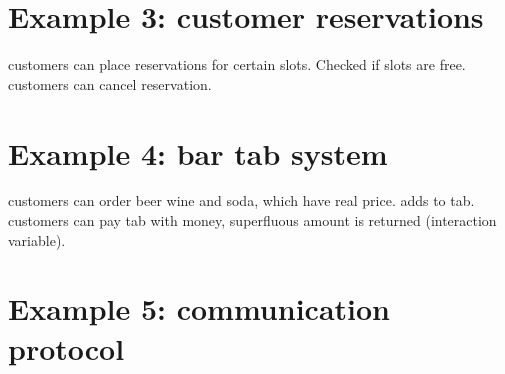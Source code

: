 \section{Example 3: customer reservations}
customers can place reservations for certain slots. Checked if slots are free. customers can cancel reservation.

\section{Example 4: bar tab system}
customers can order beer wine and soda, which have real price. adds to tab. customers can pay tab with money, superfluous amount is returned (interaction variable).

\section{Example 5: communication protocol}
